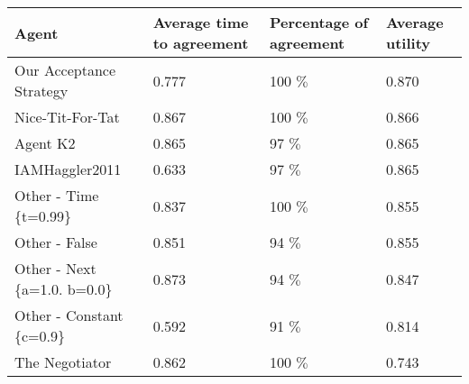 \begin{table}[H]
	\centering
	\small
\begin{tabular}{m{4.0cm}m{3.0cm}m{3.0cm}m{3.0cm}}
  \toprule 
  Agent                         & Average time to agreement & Percentage of agreement & Average utility \\ 
  \midrule
  Our Acceptance Strategy       & 0.777                                                                 & 100 $\%$                                                             & 0.870                                                       \\ 
  Nice-Tit-For-Tat              & 0.867                                                                 & 100 $\%$                                                             & 0.866                                                       \\ 
  Agent K2                      & 0.865                                                                 & 97 $\%$                                                             & 0.865                                                       \\ 
  IAMHaggler2011                & 0.633                                                                 & 97 $\%$                                                             & 0.865                                                       \\ 
  Other - Time \{t=0.99\}       & 0.837                                                                 & 100 $\%$                                                             & 0.855                                                       \\ 
  Other - False                 & 0.851                                                                 & 94 $\%$                                                             & 0.855                                                       \\ 
  Other - Next \{a=1.0. b=0.0\} & 0.873                                                                 & 94 $\%$                                                              & 0.847                                                       \\ 
  Other - Constant \{c=0.9\}    & 0.592                                                                 & 91 $\%$                                                              & 0.814                                                       \\ 
  The Negotiator                & 0.862                                                                 & 100  $\%$                                                            & 0.743                                                       \\ 

\end{tabular}
\end{table}
